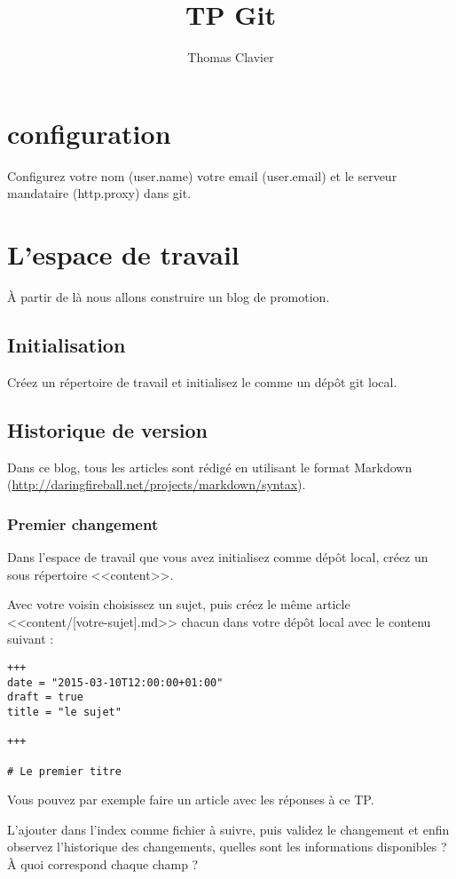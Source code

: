 \documentclass[a4paper]{article}
\title{TP Git}
\author{Thomas Clavier}
\date{}
\begin{document}
\maketitle

\section{configuration}

Configurez votre nom (user.name) votre email (user.email) et le serveur mandataire (http.proxy) dans git. 

\section{L'espace de travail}

À partir de là nous allons construire un blog de promotion.

\subsection{Initialisation}
Créez un répertoire de travail et initialisez le comme un dépôt git local.

\subsection{Historique de version}
Dans ce blog, tous les articles sont rédigé en utilisant le format Markdown (\url{http://daringfireball.net/projects/markdown/syntax}).

\subsubsection{Premier changement}
Dans l'espace de travail que vous avez initialisez comme dépôt local, créez un sous répertoire <<content>>.

Avec votre voisin choisissez un sujet, puis créez le même article <<content/[votre-sujet].md>> chacun dans votre dépôt local avec le contenu suivant : 

\begin{verbatim}
+++
date = "2015-03-10T12:00:00+01:00"
draft = true
title = "le sujet"

+++

# Le premier titre
\end{verbatim}

Vous pouvez par exemple faire un article avec les réponses à ce TP.

L'ajouter dans l'index comme fichier à suivre, puis validez le changement et enfin observez l'historique des changements, quelles sont les informations disponibles ? À quoi correspond chaque champ ?
\end{document}
